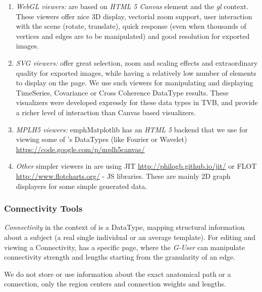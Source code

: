 	\begin{enumerate}
		\item \emph{WebGL viewers:} are based on \emph{HTML 5 Canvas} element
		and the \emph{gl} context. These viewers offer nice 3D display,
		vectorial zoom support, user interaction with the scene (rotate,
		translate), quick response (even when thousands of vertices and edges
		are to be manipulated) and good resolution for exported images.
		
		\item \emph{SVG viewers:} offer great selection, zoom and scaling
		effects and extraordinary quality for exported images, while
		having a relatively low number of elements to display on the page. We
		use such viewers for manipulating and displaying TimeSeries,
		Covariance or Cross Coherence DataType results. These visualizers
		were developed expressly for these data types in TVB, and provide a 
		richer level of interaction than Canvas based visualizers.

		\item \emph{MPLH5 viewers:}  emph{Matplotlib} has an \emph{HTML 5}
		backend that we use for viewing some of \TVB's DataTypes (like
		Fourier or Wavelet) \url{https://code.google.com/p/mplh5canvas/}

		\item \emph{Other} simpler viewers in \TVB are using JIT
		\url{http://philogb.github.io/jit/} or FLOT
		\url{http://www.flotcharts.org/} - JS libraries. These are mainly
		2D graph displayers for some simple \TVB generated data.
	\end{enumerate}

\subsubsection{Connectivity Tools}

		\emph{Connectivity} in the context of \TVB is a DataType, mapping structural
		information about a subject (a real single individual or an average template). For
		editing and viewing a Connectivity, \TVB has a specific page, where
		the \emph{G-User} can manipulate connectivity strength and lengths
		starting from the granularity of an edge.

		We do not store or use information about the exact anatomical path or
		a connection, only the region centers and connection weights and
		lengths.

